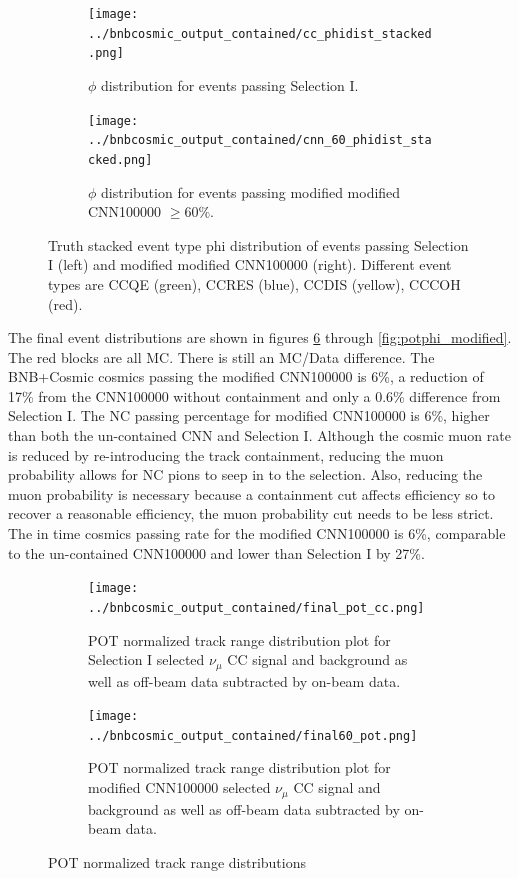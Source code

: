 \begin{figure}[htp!]
\centering
	\begin{subfigure}[b]{.475\textwidth}
	\centering
		\texttt{[image: ../bnbcosmic\_output\_contained/cc\_phidist\_stacked.png]}
		\caption{$\phi$ distribution for events passing Selection I.} 
		\label{fig:ccphistacked_modified}
	\end{subfigure}
	\quad
	\begin{subfigure}[b]{.475\textwidth}
	\centering
		\texttt{[image: ../bnbcosmic\_output\_contained/cnn\_60\_phidist\_stacked.png]}
		\caption{$\phi$ distribution for events passing modified modified CNN100000 $\geq 60\%$.} 
		\label{fig:cnn60phistacked_modified}
	\end{subfigure}
\caption{Truth stacked event type phi distribution of events passing Selection I (left) and modified modified CNN100000 (right). Different event types are CCQE (green), CCRES (blue), CCDIS (yellow), CCCOH (red).}
\label{fig:phistacked_modified}
\end{figure}


The final event distributions are shown in figures \ref{fig:pottrack_modified} through \ref{fig:potphi_modified}. The red blocks are all MC. There is still an MC/Data difference. The BNB+Cosmic cosmics passing the modified CNN100000 is 6\%, a reduction of 17\% from the CNN100000 without containment and only a 0.6\% difference from Selection I. The NC passing percentage for modified CNN100000 is 6\%, higher than both the un-contained CNN and Selection I. Although the cosmic muon rate is reduced by re-introducing the track containment, reducing the muon probability allows for NC pions to seep in to the selection. Also, reducing the muon probability is necessary because a containment cut affects efficiency so to recover a reasonable efficiency, the muon probability cut needs to be less strict. The in time cosmics passing rate for the modified CNN100000 is 6\%, comparable to the un-contained CNN100000 and lower than Selection I by 27\%. 
\begin{figure}[htp!]
\centering
	\begin{subfigure}[t]{.475\textwidth}
		\texttt{[image: ../bnbcosmic\_output\_contained/final\_pot\_cc.png]}
		\caption{POT normalized track range distribution plot for Selection I selected $\nu_{\mu}$ CC signal and background as well as off-beam data subtracted by on-beam data.} 
		\label{fig:ccpottrack_modified}
	\end{subfigure}
	\begin{subfigure}[t]{.475\textwidth}
	\centering
		\texttt{[image: ../bnbcosmic\_output\_contained/final60\_pot.png]}
		\caption{POT normalized track range distribution plot for modified CNN100000 selected $\nu_{\mu}$ CC signal and background as well as off-beam data subtracted by on-beam data.} 
	\label{fig:cnnpottrack_modified}
	\end{subfigure}
\caption{POT normalized track range distributions}
\label{fig:pottrack_modified}
\end{figure}

